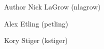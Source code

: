 \begin{DoxyAuthor}{Author}
Nick La\-Grow (nlagrow) 

Alex Etling (petling) 

Kory Stiger (kstiger) 
\end{DoxyAuthor}
